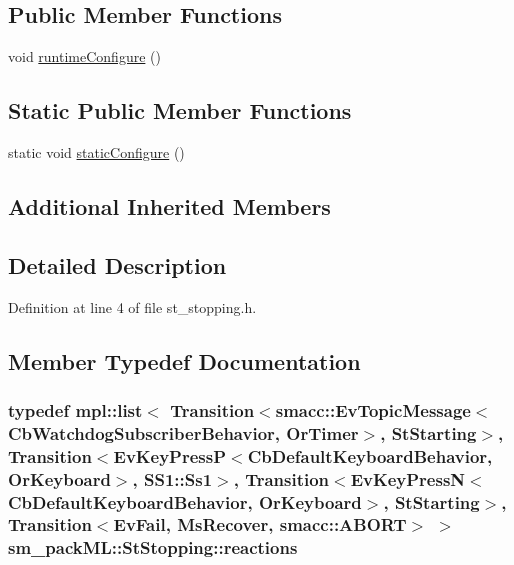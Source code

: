 \subsection*{Public Member Functions}
\begin{DoxyCompactItemize}
\item 
void \hyperlink{structsm__packML_1_1StStopping_a806226c89b297d619906049ff04df11f}{runtime\+Configure} ()
\end{DoxyCompactItemize}
\subsection*{Static Public Member Functions}
\begin{DoxyCompactItemize}
\item 
static void \hyperlink{structsm__packML_1_1StStopping_a58aa3dd672aeb0496ce2047da298c611}{static\+Configure} ()
\end{DoxyCompactItemize}
\subsection*{Additional Inherited Members}


\subsection{Detailed Description}


Definition at line 4 of file st\+\_\+stopping.\+h.



\subsection{Member Typedef Documentation}
\subsubsection[{\texorpdfstring{reactions}{reactions}}]{\setlength{\rightskip}{0pt plus 5cm}typedef mpl\+::list$<$ Transition$<${\bf smacc\+::\+Ev\+Topic\+Message}$<${\bf Cb\+Watchdog\+Subscriber\+Behavior}, {\bf Or\+Timer}$>$, {\bf St\+Starting}$>$, Transition$<$Ev\+Key\+PressP$<$Cb\+Default\+Keyboard\+Behavior, {\bf Or\+Keyboard}$>$, {\bf S\+S1\+::\+Ss1}$>$, Transition$<$Ev\+Key\+PressN$<$Cb\+Default\+Keyboard\+Behavior, {\bf Or\+Keyboard}$>$, {\bf St\+Starting}$>$, Transition$<${\bf Ev\+Fail}, {\bf Ms\+Recover}, {\bf smacc\+::\+A\+B\+O\+RT}$>$ $>$ {\bf sm\+\_\+pack\+M\+L\+::\+St\+Stopping\+::reactions}}\hypertarget{structsm__packML_1_1StStopping_acacdf1faa8c79729b1d2725500858853}{}\label{structsm__packML_1_1StStopping_acacdf1faa8c79729b1d2725500858853}


